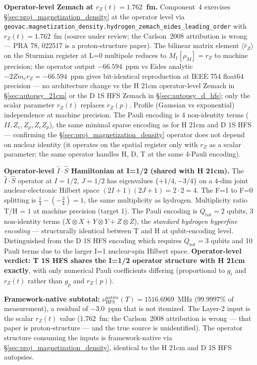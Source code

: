 \documentclass[11pt]{article}
\begin{document}
\textbf{Operator-level Zemach at $r_Z(t) = 1.762$~fm.}  Component~4
exercises \S\ref{sec:proj_magnetization_density} at the operator level
via \texttt{geovac.magnetization\_density.hydrogen\_zemach\_eides\_leading\_order}
with $r_Z(t) = 1.762$~fm (source under review; the Carlson~2008 attribution is wrong --- PRA 78, 022517 is a proton-structure paper).  The bilinear matrix
element $\langle\hat{r}_Z\rangle$ on the Sturmian register at L=0
multipole reduces to $M_1[\rho_M] = r_Z$ to machine precision; the
operator output $-66.594$~ppm vs Eides analytic $-2 Z m_e r_Z = -66.594$~ppm
gives bit-identical reproduction at IEEE 754 float64 precision --- no
architecture change vs the H 21cm operator-level Zemach in
\S\ref{sec:autopsy_21cm} or the D 1S HFS Zemach in
\S\ref{sec:autopsy_d_hfs}; only the scalar parameter $r_Z(t)$ replaces
$r_Z(p)$.  Profile (Gaussian vs exponential) independence at machine
precision.  The Pauli encoding is 4 non-identity terms
($II, Z_e, Z_p, Z_e Z_p$), the same minimal sparse encoding as for H
21cm and D 1S HFS --- confirming the
\S\ref{sec:proj_magnetization_density} operator does not depend on
nuclear identity (it operates on the spatial register only with $r_Z$
as a scalar parameter; the same operator handles H, D, T at the same
4-Pauli encoding).

\textbf{Operator-level $\hat{I}\cdot\hat{S}$ Hamiltonian at I=1/2
(shared with H 21cm).}  The $\hat{I}\cdot\hat{S}$ operator at $I=1/2$,
$J=1/2$ has eigenvalues $\{+1/4, -3/4\}$ on a 4-dim joint
nuclear-electronic Hilbert space $(2I+1)(2J+1) = 2 \cdot 2 = 4$.  The
F=1 to F=0 splitting is $\frac{1}{4} - (-\frac{3}{4}) = 1$, the same
multiplicity as hydrogen.  Multiplicity ratio T/H = $1$ at machine
precision (target 1).  The Pauli encoding is $Q_\text{tot}=2$ qubits,
3 non-identity terms ($X \otimes X + Y \otimes Y + Z \otimes Z$), the
\emph{standard hydrogen hyperfine encoding} --- structurally identical
between T and H at qubit-encoding level.  Distinguished from the D 1S
HFS encoding which requires $Q_\text{tot}=3$ qubits and 10 Pauli terms
due to the larger I=1 nuclear-spin Hilbert space.
\textbf{Operator-level verdict: T 1S HFS shares the I=1/2 operator
structure with H 21cm exactly}, with only numerical Pauli
coefficients differing (proportional to $g_t$ and $r_Z(t)$ rather than
$g_p$ and $r_Z(p)$).

\textbf{Framework-native subtotal:} $\nu_\text{HFS}^\text{native}(T) =
1516.6969$~MHz ($99.9997\%$ of measurement), a residual of
$-3.0$~ppm that is not itemized.  The Layer-2 input is the
scalar $r_Z(t)$ value ($1.762$~fm; the Carlson~2008 attribution is
wrong --- that paper is proton-structure --- and the true source is
unidentified).  The
operator structure consuming the inputs is framework-native via
\S\ref{sec:proj_magnetization_density}, identical to the H 21cm and
D 1S HFS autopsies.
\end{document}
